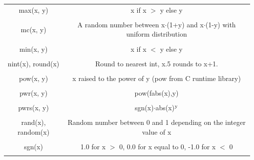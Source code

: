 \begin{longtable}{c c}
max(x, y) & \begin{minipage}{20em}
x if x $>$ y else y
\end{minipage}\\ \\

mc(x, y) & \begin{minipage}{20em}
A random number between x$\cdot$(1+y) and x$\cdot$(1-y) with uniform distribution
\end{minipage}\\ \\

min(x, y) & \begin{minipage}{20em}
x if x $<$ y else y
\end{minipage}\\ \\

nint(x), round(x) & \begin{minipage}{20em}
Round to nearest int, x.5 rounds to x+1.
\end{minipage}\\ \\

pow(x, y) & \begin{minipage}{20em}
x raised to the power of y (pow from C runtime library)
\end{minipage}\\ \\

pwr(x, y) & \begin{minipage}{20em}
pow(fabs(x),y)
\end{minipage}\\ \\

pwrs(x, y) & \begin{minipage}{20em}
sgn(x)$\cdot$abs(x)$\rm{^y}$
\end{minipage}\\ \\

rand(x), random(x) & \begin{minipage}{20em}
Random number between 0 and 1 depending on the integer value of x
\end{minipage}\\ \\

sgn(x) & \begin{minipage}{20em}
1.0 for x $>$ 0, 0.0 for x equal to 0, -1.0 for x $<$ 0 
\end{minipage}\\ \\


\end{longtable}
